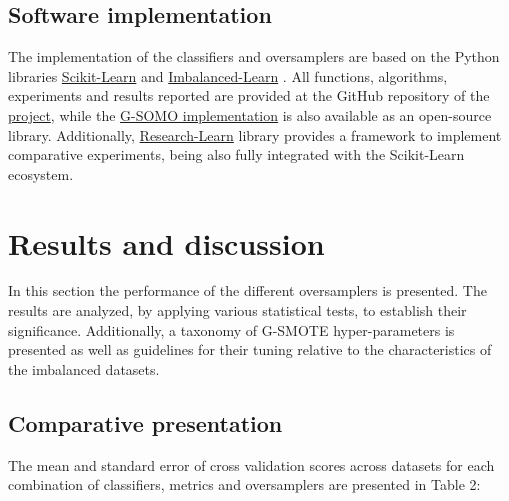 \documentclass[parskip=full]{scrartcl}
\begin{document}
\subsection{Software implementation}

The implementation of the classifiers and oversamplers are based on the Python libraries \href{https://scikit-learn.org/stable/}{Scikit-Learn} \cite{Pedregosa2012} and \href{https://imbalanced-learn.org/en/stable/}{Imbalanced-Learn} \cite{Lemaitre2016}. All functions, algorithms, experiments and results reported are provided at the GitHub repository of the \href{https://github.com/AlgoWit/publications/tree/master/gsomo}{project}, while the \href{https://github.com/AlgoWit/cluster-over-sampling}{ G-SOMO implementation} is also available as an open-source library. Additionally, \href{https://research-learn.readthedocs.io/en/latest/?badge=latest}{Research-Learn} library provides a framework to implement comparative experiments, being also fully integrated with the Scikit-Learn ecosystem.

\section{Results and discussion}

In this section the performance of the different oversamplers is presented. The results are analyzed, by applying various statistical tests, to establish their significance. Additionally, a taxonomy of G-SMOTE hyper-parameters is presented as well as guidelines for their tuning relative to the characteristics of the imbalanced datasets.

\subsection{Comparative presentation}

The mean and standard error of cross validation scores across datasets for each combination of classifiers, metrics and oversamplers are presented in Table 2:

\end{document}
